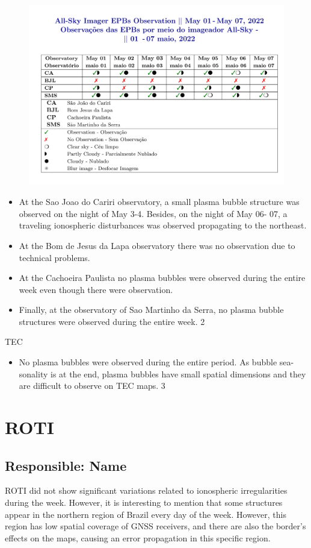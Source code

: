 \documentclass[a4paper, 10pt]{article}
\begin{document}
\begin{figure}[H]
    
                        \centering
   
                             \includegraphics[width=14cm]{./figures//figureImager_0.png}

                        \end{figure}

                     \begin{itemize} 
 \item  At the Sao Joao do Cariri observatory, a small plasma bubble structure was observed on the night of May 3-4. Besides, on the night of May 06- 07, a traveling ionospheric disturbances was observed propagating to the northeast. 
\item  At the Bom de Jesus da Lapa observatory there was no observation due to technical problems. 
\item  At the Cachoeira Paulista no plasma bubbles were observed during the entire week even though there were observation. 
\item  Finally, at the observatory of Sao Martinho da Serra, no plasma bubble structures were observed during the entire week. 2 
\end{itemize} 
 TEC 
\begin{itemize} 
 \item  No plasma bubbles were observed during the entire period. As bubble sea- sonality is at the end, plasma bubbles have small spatial dimensions and they are difficult to observe on TEC maps.  3 
\end{itemize} 
 \section{ROTI} 
 \subsection{Responsible: Name} 
 
ROTI did not show significant variations related to ionospheric irregularities during the week. However, it is interesting to mention that some structures appear in the northern region of Brazil every day of the week. However, this region has low spatial coverage of GNSS receivers, and there are also the border's effects on the maps, causing an error propagation in this specific region.
\end{document}
